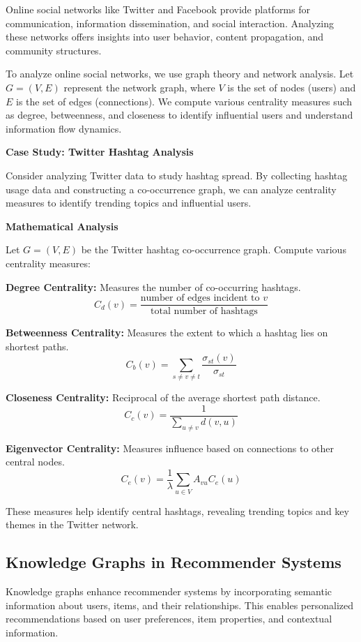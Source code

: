\documentclass[12pt]{book} %
\begin{document}
Online social networks like Twitter and Facebook provide platforms for communication, information dissemination, and social interaction. Analyzing these networks offers insights into user behavior, content propagation, and community structures.

To analyze online social networks, we use graph theory and network analysis. Let \(G = (V, E)\) represent the network graph, where \(V\) is the set of nodes (users) and \(E\) is the set of edges (connections). We compute various centrality measures such as degree, betweenness, and closeness to identify influential users and understand information flow dynamics.

\textbf{Case Study: Twitter Hashtag Analysis}

Consider analyzing Twitter data to study hashtag spread. By collecting hashtag usage data and constructing a co-occurrence graph, we can analyze centrality measures to identify trending topics and influential users.

\textbf{Mathematical Analysis}

Let \(G = (V, E)\) be the Twitter hashtag co-occurrence graph. Compute various centrality measures:

\textbf{Degree Centrality:} Measures the number of co-occurring hashtags.
\[ C_d(v) = \frac{\text{number of edges incident to } v}{\text{total number of hashtags}} \]

\textbf{Betweenness Centrality:} Measures the extent to which a hashtag lies on shortest paths.
\[ C_b(v) = \sum_{s \neq v \neq t} \frac{\sigma_{st}(v)}{\sigma_{st}} \]

\textbf{Closeness Centrality:} Reciprocal of the average shortest path distance.
\[ C_c(v) = \frac{1}{\sum_{u \neq v} d(v, u)} \]

\textbf{Eigenvector Centrality:} Measures influence based on connections to other central nodes.
\[ C_e(v) = \frac{1}{\lambda} \sum_{u \in V} A_{vu} C_e(u) \]

These measures help identify central hashtags, revealing trending topics and key themes in the Twitter network.

\subsection{Knowledge Graphs in Recommender Systems}

Knowledge graphs enhance recommender systems by incorporating semantic information about users, items, and their relationships. This enables personalized recommendations based on user preferences, item properties, and contextual information.
\end{document}

